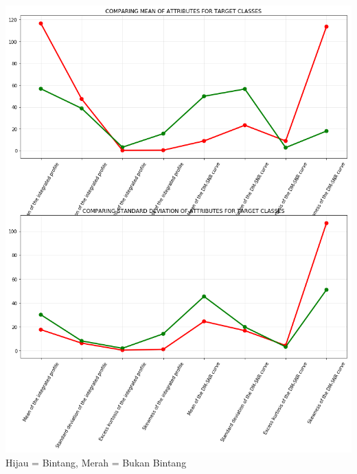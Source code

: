 \documentclass[12pt]{article}
\begin{document}
\begin{enumerate}
        \newline \includegraphics[scale=0.475]{mean-std-compare.png}
        \newline Hijau = Bintang, Merah = Bukan Bintang
        
        \newpage
        

\end{enumerate}
\end{document}
